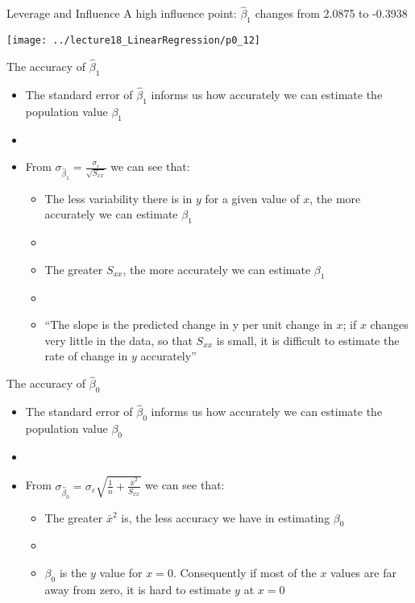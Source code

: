 \documentclass[xcolor=dvipsnames]{beamer}
\begin{document}
\begin{frame}{Leverage and Influence}
A high influence point: $\hat{\beta}_1$ changes from 2.0875 to -0.3938
\begin{center}
	\texttt{[image: ../lecture18\_LinearRegression/p0\_12]}
\end{center}
\end{frame}

\begin{frame}{The accuracy of $\hat{\beta}_1$}
	\begin{itemize}
		\item The standard error of $\hat{\beta}_1$ informs us how accurately we can estimate the population value $\beta_1$ \pause
		\item[]
		\item From $\sigma_{\hat{\beta}_1} = \frac{\sigma_{\varepsilon}}{\sqrt{S_{xx}}}$ we can see that:
		\begin{itemize}
			\item The less variability there is in $y$ for a given value of $x$, the more accurately we can estimate $\beta_1$ \pause
			\item[]
			\item The greater $S_{xx}$, the more accurately we can estimate $\beta_1$ \pause
			\item[]
			\item ``The slope is the predicted change in y per unit change in $x$; if $x$ changes very little in the data, so that $S_{xx}$ is small, it is difficult to estimate the rate of change in $y$ accurately''
		\end{itemize}
	\end{itemize}
\end{frame}

\begin{frame}{The accuracy of $\hat{\beta}_0$}
	\begin{itemize}
		\item The standard error of $\hat{\beta}_0$ informs us how accurately we can estimate the population value $\beta_0$ \pause
		\item[]
		\item From $\sigma_{\hat{\beta}_0} = \sigma_{\varepsilon} \sqrt{\frac{1}{n}+\frac{\bar{x}^2}{S_{xx}}}$ we can see that: \pause
		\begin{itemize}
			\item The greater $\bar{x}^2$ is, the less accuracy we have in estimating $\beta_0$ \pause
			\item[]
			\item $\beta_0$ is the $y$ value for $x = 0$. Consequently if most of the $x$ values are far away from zero, it is hard to estimate $y$ at $x = 0$
		\end{itemize}
	\end{itemize}
\end{frame}
\end{document}
